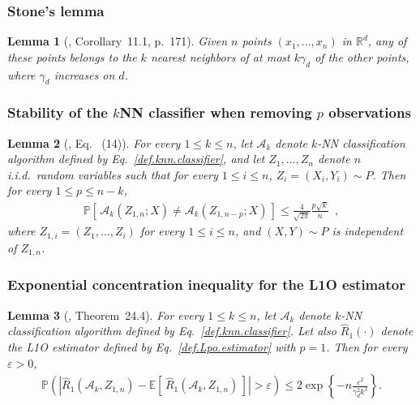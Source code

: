 \documentclass[twoside,11pt]{article}
\numberwithin{equation}{section}
\newtheorem{lem}{Lemma}[section]
\newcommand{\prob}[1]{\mathbb{P}\left(#1 \right)}
\newcommand{\ga}[1]{\left\{#1\right\}}
\newcommand{\1}{\mathds{1}}%
\newcommand{\paren}[1]{\left( #1 \right)}
\newcommand{\croch}[1]{\left[\, #1 \,\right]}
\newcommand{\iid}{\textit{i.i.d.}\ }
\newcommand{\E}{\mathbb{E}}
\renewcommand{\P}{\mathbb{P}}
\newcommand{\Rh}{\widehat{R}}
\newcommand{\A}{\mathcal{A}}
\numberwithin{equation}{section}
\theoremstyle{plain}
\begin{document}
\subsubsection{Stone's lemma}
\begin{lem}[\cite{DeGyLu_1996}, Corollary~11.1, p.~171]
%
\label{Stone}
%
Given $n$ points $(x_1,...,x_n)$ in $\mathbb{R}^d$, any of these points belongs to the $k$ nearest neighbors of at most $k\gamma_d$ of the other points, where $\gamma_d$ increases on $d$.
\end{lem}





\subsubsection{Stability of the $k$NN classifier when removing $p$ observations}
\begin{lem}[\cite{DeWa79}, Eq.~ (14)]
	\label{Lemma : HOresult}
For every $1\leq k \leq n$, let $\A_k$ denote $k$-NN classification algorithm defined by Eq.~\eqref{def.knn.classifier}, and let $Z_1,\ldots,Z_n$ denote $n$ \iid random variables such that for every $1\leq i\leq n$, $Z_i = (X_i,Y_i) \sim P$.
%
Then for every $1\leq p \leq n-k$,
\begin{eqnarray*}
\P\croch{ \A_k(Z_{1,n};X) \neq \A_k(Z_{1,n-p};X) } \leq \frac{4}{\sqrt{2\pi}}\frac{ p \sqrt{k}}{ n} \enspace ,
\end{eqnarray*}
where $Z_{1,i} = \paren{Z_1,\ldots,Z_i}$ for every $1\leq i\leq n$, and $(X,Y) \sim P$ is independent of $Z_{1,n}$.
\end{lem}



\subsubsection{Exponential concentration inequality for the L1O estimator}
\begin{lem}[\cite{DeGyLu_1996}, Theorem~24.4]
	\label{Lemma : UpperBoundL1OEstimator}
For every $1\leq k \leq n$, let $\A_k$ denote $k$-NN classification algorithm defined by Eq.~\eqref{def.knn.classifier}. Let also $\Rh_1(\cdot)$ denote the L1O estimator defined by Eq.~\eqref{def.Lpo.estimator} with $p=1$.
%
Then for every $\varepsilon>0$,
\begin{eqnarray*}
\prob{\left| \widehat{R}_1(\A_k,Z_{1,n}) - \E\croch{ \widehat{R}_1(\A_k,Z_{1,n})  } \right|> \varepsilon} \leq 2\exp\ga{-n \frac{ \varepsilon^2}{\gamma_d^2 k^2} } .
\end{eqnarray*}
\end{lem}
\end{document}
